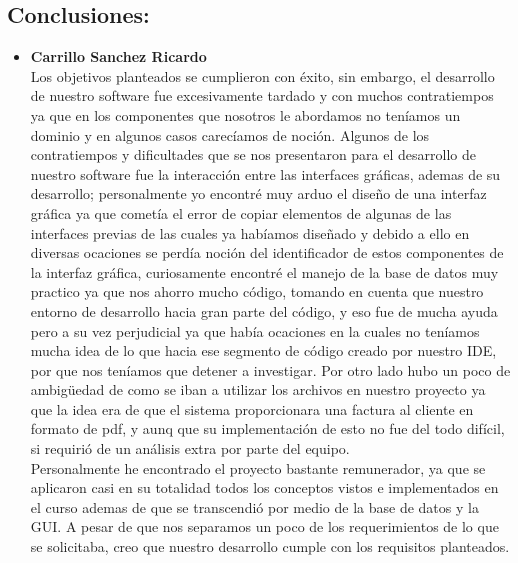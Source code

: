 \documentclass[a4paper,12pt]{article}
\begin{document}
\begin{flushleft}
\section{Conclusiones:}

\begin{itemize}
\item{\textbf{Carrillo Sanchez Ricardo}}
\vspace{0.3cm}
\textsf{\\Los objetivos planteados se cumplieron con éxito, sin embargo, el desarrollo de nuestro software fue excesivamente tardado y con muchos contratiempos ya que en los componentes que nosotros le abordamos no teníamos un dominio y en algunos casos carecíamos de noción. Algunos de los contratiempos y dificultades que se nos presentaron para el desarrollo de nuestro software fue la interacción entre las interfaces gráficas, ademas de su desarrollo; personalmente yo encontré muy arduo el diseño de una interfaz gráfica ya que cometía el error de copiar elementos de algunas de las interfaces previas de las cuales ya habíamos diseñado y debido a ello en diversas ocaciones se perdía noción del identificador de estos componentes de la interfaz gráfica, curiosamente encontré el manejo de la base de datos muy practico ya que nos ahorro mucho código, tomando en cuenta que nuestro entorno de desarrollo hacia gran parte del código, y eso fue de mucha ayuda pero a su vez perjudicial ya que había ocaciones en la cuales no teníamos mucha idea de lo que hacia ese segmento de código creado por nuestro IDE, por que nos teníamos que detener a investigar. Por otro lado hubo un poco de ambigüedad de como se iban a utilizar los archivos en nuestro proyecto ya que la idea era de que el sistema proporcionara una factura al cliente en formato de pdf, y aunq que su implementación de esto no fue del todo difícil, si requirió de un análisis extra por parte del equipo.\vspace{0.3cm}\\Personalmente he encontrado el proyecto bastante remunerador, ya que se aplicaron casi en su totalidad todos los conceptos vistos e implementados en el curso ademas de que se transcendió por medio de la base de datos y la GUI. A pesar de que nos separamos un poco de los requerimientos de lo que se solicitaba, creo que nuestro desarrollo cumple con los requisitos planteados.}


\end{itemize}
\end{flushleft}
\end{document}
